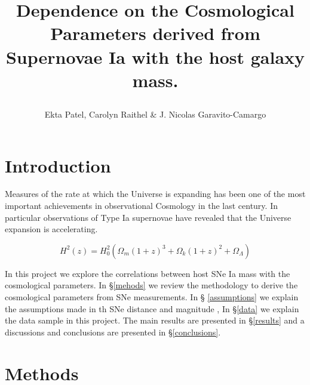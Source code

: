\documentclass[11pt]{article}
\title{\begin{LARGE}
{Dependence on the Cosmological Parameters derived from Supernovae Ia
with the host galaxy mass.}
\end{LARGE}}
\begin{document}
\maketitle

\author{ \begin{center}
Ekta Patel, Carolyn Raithel \& J. Nicolas Garavito-Camargo
\end{center}}

\section{Introduction}

Measures of the rate at which the Universe is expanding has been one of
the most important achievements in observational Cosmology in the last
century. In particular observations of Type Ia supernovae have revealed
that the Universe expansion is accelerating.


\begin{equation}
H^2(z) = H_0^2 (\Omega_m(1+z)^3 + \Omega_k (1+z)^2 + \Omega_{\Lambda})
\end{equation}

In this project we explore the correlations between host SNe Ia mass
with the cosmological parameters. In \S \ref{mehods} we review the methodology to
derive the cosmological parameters from SNe measurements. In \S
\ref{assumptions} we explain the assumptions made in th SNe distance
and magnitude , In \S \ref{data} we explain the data sample in this
project. The main results are presented in \S \ref{results} and a
discussions and conclusions are presented in \S \ref{conclusions}.



\section{Methods}{\label{methods}}
\end{document}
